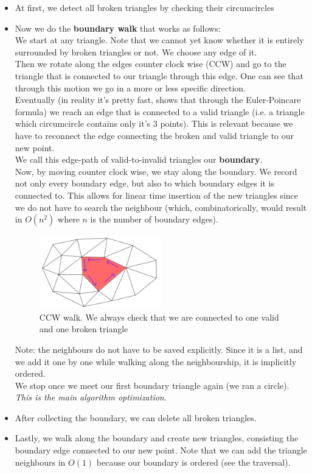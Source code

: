 \begin{itemize}
    \item At first, we detect all broken triangles by checking their circumcircles
    \item Now we do the \textbf{boundary walk} that works as follows:\\
    We start at any triangle. Note that we cannot yet know whether it is entirely surrounded by broken triangles or not. We choose any edge of it.\\
    Then we rotate along the edges counter clock wise (CCW) and go to the triangle that is connected to our triangle through this edge. One can see that through this motion we go in a more or less specific direction.\\
    Eventually (in reality it's pretty fast, \cite{Green1978} shows that through the Euler-Poincare formula) we reach an edge that is connected to a valid triangle (i.e. a triangle which circumcircle contains only it's 3 points). This is relevant because we have to reconnect the edge connecting the broken and valid triangle to our new point.\\
    We call this edge-path of valid-to-invalid triangles our \textbf{boundary}.\\
    Now, by moving counter clock wise, we stay along the boundary. We record not only every boundary edge, but also to which boundary edges it is connected to. This allows for linear time insertion of the new triangles since we do not have to search the neighbour (which, combinatorically, would result in $O(n^2)$ where $n$ is the number of boundary edges).
    \begin{figure}[H]
    \centering
    \includegraphics[width=0.5\textwidth]{ccwBoundaryWalk.png}
    \caption{CCW walk. We always check that we are connected to one valid and one broken triangle}
    \label{fig:my_label}
    \end{figure}
    Note: the neighbours do not have to be saved explicitly. Since it is a list, and we add it one by one while walking along the neighbourship, it is implicitly ordered.\\
    We stop once we meet our first boundary triangle again (we ran a circle).\\
    \textit{This is the main algorithm optimization}.
    \item After collecting the boundary, we can delete all broken triangles.
    \item Lastly, we walk along the boundary and create new triangles, consisting the boundary edge connected to our new point. Note that we can add the triangle neighbours in $O(1)$ because our boundary is ordered (see the traversal).
\end{itemize}

